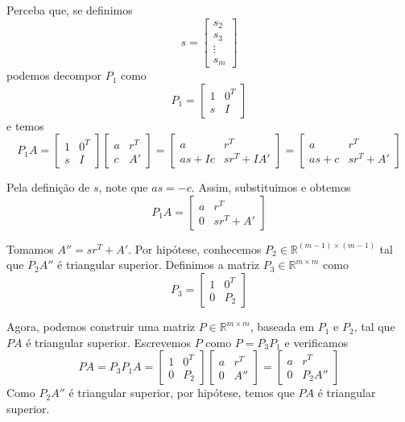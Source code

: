 \documentclass[]{article}
\numberwithin{equation}{section}
\begin{document}
Perceba que, se definimos
$$
s =
\begin{bmatrix}
s_2 \\
s_3 \\
\vdots \\
s_m
\end{bmatrix}
$$
podemos decompor $P_1$ como
$$
P_1 =
\begin{bmatrix}
1 & 0^T \\
s & I
\end{bmatrix}
$$
e temos
$$
P_1A =
\begin{bmatrix}
1 & 0^T \\
s & I
\end{bmatrix}
\begin{bmatrix}
a & r^T \\
c & A'
\end{bmatrix}
=
\begin{bmatrix}
a & r^T \\
as + Ic & sr^T + IA'
\end{bmatrix}
=
\begin{bmatrix}
a & r^T \\
as + c & sr^T + A'
\end{bmatrix}
$$

Pela definição de $s$, note que $as = -c$. Assim, substituimos e obtemos
$$
P_1A =
\begin{bmatrix}
a & r^T \\
0 & sr^T + A'
\end{bmatrix}
$$

Tomamos $A'' = sr^T + A'$. Por hipótese, conhecemos $P_2 \in \mathbb{R}^{(m - 1) \times (m - 1)}$ tal que $P_2 A''$ é triangular superior. Definimos a matriz $P_3 \in \mathbb{R}^{m \times m}$ como
$$
P_3 =
\begin{bmatrix}
1 & 0^T \\
0 & P_2
\end{bmatrix}
$$

Agora, podemos construir uma matriz $P \in \mathbb{R}^{m \times m}$, baseada em $P_1$ e $P_2$, tal que $PA$ é triangular superior. Escrevemos $P$ como $P = P_3 P_1$ e verificamos
$$
PA = P_3 P_1 A =
\begin{bmatrix}
1 & 0^T \\
0 & P_2
\end{bmatrix}
\begin{bmatrix}
a & r^T \\
0 & A''
\end{bmatrix}
=
\begin{bmatrix}
a & r^T \\
0 & P_2 A''
\end{bmatrix}
$$
Como $P_2 A''$ é triangular superior, por hipótese, temos que $PA$ é triangular superior.
\end{document}
